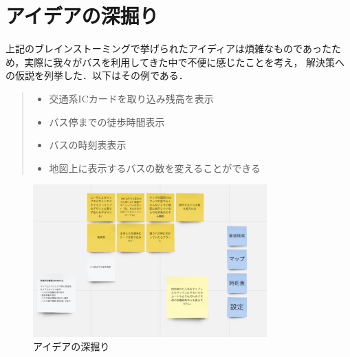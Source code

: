 \section{アイデアの深掘り}

上記のブレインストーミングで挙げられたアイディアは煩雑なものであったため，実際に我々がバスを利用してきた中で不便に感じたことを考え，
解決策への仮説を列挙した．以下はその例である．

\begin{quote}
    \begin{itemize}
        \item 交通系ICカードを取り込み残高を表示
        \item バス停までの徒歩時間表示
        \item バスの時刻表表示
        \item 地図上に表示するバスの数を変えることができる
    \end{itemize}
\end{quote}

\begin{figure}[H]
    \centering
    \includegraphics[width=9cm]{images/dig.png}
    \caption{アイデアの深掘り}
    \label{fig:dig}
\end{figure}

